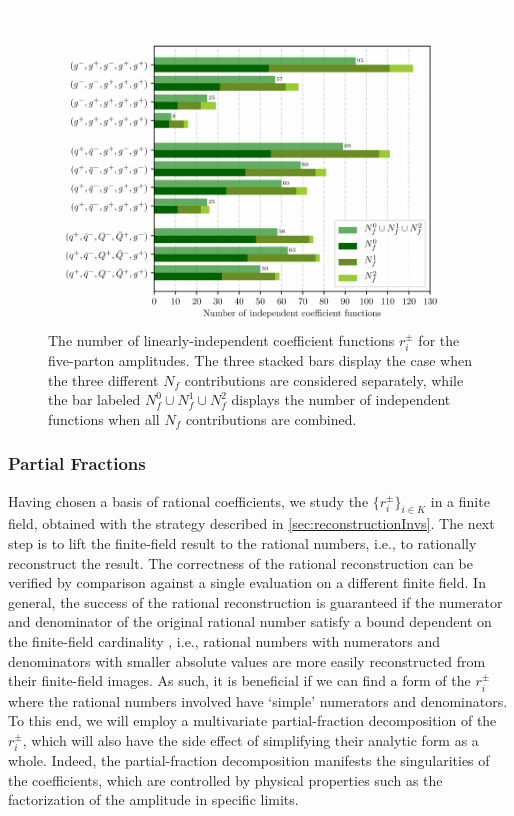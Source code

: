\begin{figure}[ht]
  \centering
  \includegraphics[width = 1.0\textwidth]{plots/function_space_dimensions.pdf}
  \caption{
    The number of linearly-independent coefficient functions $r_i^\pm$ for the five-parton amplitudes.
    The three stacked bars display the case when the three different $N_f$ contributions are considered separately,
    while the bar labeled $N_f^0\cup N_f^1\cup N_f^2$ displays the number of independent functions
    when all $N_f$ contributions are combined.
  }
  \label{fig:remainderStructure}
\end{figure}


\subsubsection{Partial Fractions}
\label{sec:PartialFractions}

Having chosen a basis of rational coefficients, we study the $\{r_i^\pm\}_{i\in K}$
in a finite field, obtained with the strategy described 
in \cref{sec:reconstructionInvs}.
The next step is to lift the finite-field result to the rational numbers, 
i.e., to rationally reconstruct the result. 
The correctness of the rational reconstruction can
be verified by comparison against a single evaluation on a
different finite field. 
In general, the success of the rational reconstruction is
guaranteed if the numerator and denominator of the original rational
number satisfy a bound dependent on the finite-field cardinality
\cite{Wang:1981:PAU:800206.806398, vonManteuffel:2014ixa, Peraro:2016wsq},
i.e., rational numbers with numerators and denominators with
smaller absolute values are more easily reconstructed from their finite-field
images. As such, it is beneficial if we can find a form of the
$r_i^\pm$ where the rational numbers involved have `simple' numerators and
denominators. 
To this end, we will employ a multivariate partial-fraction decomposition
of the $r_i^\pm$, which will also have the side effect of simplifying their
analytic form as a whole. 
Indeed, the partial-fraction decomposition manifests the singularities
of the coefficients, which are controlled by physical properties such
as the factorization of the amplitude in specific limits.


